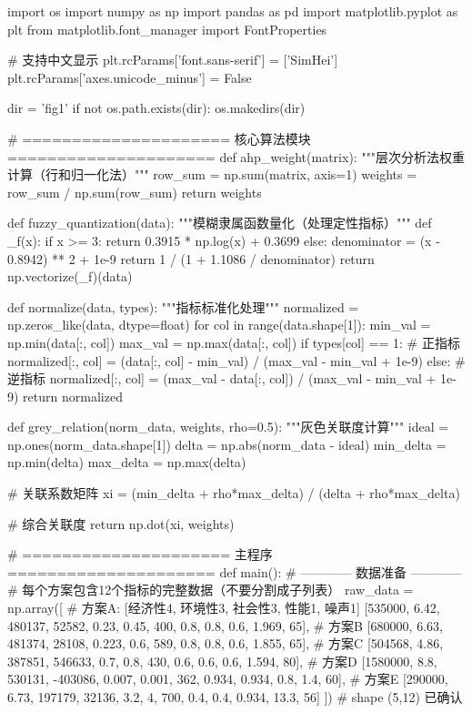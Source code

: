 \documentclass[12pt]{article}
\begin{document}
\begin{python}[language=Python, caption= 全部代码]

import os
import numpy as np
import pandas as pd
import matplotlib.pyplot as plt
from matplotlib.font_manager import FontProperties

# 支持中文显示
plt.rcParams['font.sans-serif'] = ['SimHei']
plt.rcParams['axes.unicode_minus'] = False


dir = 'fig1'
if not os.path.exists(dir):
    os.makedirs(dir)

# ===================== 核心算法模块 =====================
def ahp_weight(matrix):
    """层次分析法权重计算（行和归一化法）"""
    row_sum = np.sum(matrix, axis=1)
    weights = row_sum / np.sum(row_sum)
    return weights

def fuzzy_quantization(data):
    """模糊隶属函数量化（处理定性指标）"""
    def _f(x):
        if x >= 3:
            return 0.3915 * np.log(x) + 0.3699
        else:
            denominator = (x - 0.8942) ** 2 + 1e-9
            return 1 / (1 + 1.1086 / denominator)
    return np.vectorize(_f)(data)

def normalize(data, types):
    """指标标准化处理"""
    normalized = np.zeros_like(data, dtype=float)
    for col in range(data.shape[1]):
        min_val = np.min(data[:, col])
        max_val = np.max(data[:, col])
        if types[col] == 1:  # 正指标
            normalized[:, col] = (data[:, col] - min_val) / (max_val - min_val + 1e-9)
        else:  # 逆指标
            normalized[:, col] = (max_val - data[:, col]) / (max_val - min_val + 1e-9)
    return normalized

def grey_relation(norm_data, weights, rho=0.5):
    """灰色关联度计算"""
    ideal = np.ones(norm_data.shape[1])
    delta = np.abs(norm_data - ideal)
    min_delta = np.min(delta)
    max_delta = np.max(delta)
    
    # 关联系数矩阵
    xi = (min_delta + rho*max_delta) / (delta + rho*max_delta)
    
    # 综合关联度
    return np.dot(xi, weights)

# ===================== 主程序 =====================
def main():
    # ------------ 数据准备 ------------
    # 每个方案包含12个指标的完整数据（不要分割成子列表）
    raw_data = np.array([
        # 方案A: [经济性4, 环境性3, 社会性3, 性能1, 噪声1]
        [535000, 6.42, 480137, 52582, 0.23, 0.45, 400, 0.8, 0.8, 0.6, 1.969, 65],
        # 方案B
        [680000, 6.63, 481374, 28108, 0.223, 0.6, 589, 0.8, 0.8, 0.6, 1.855, 65],
        # 方案C
        [504568, 4.86, 387851, 546633, 0.7, 0.8, 430, 0.6, 0.6, 0.6, 1.594, 80],
        # 方案D 
        [1580000, 8.8, 530131, -403086, 0.007, 0.001, 362, 0.934, 0.934, 0.8, 1.4, 60],
        # 方案E
        [290000, 6.73, 197179, 32136, 3.2, 4, 700, 0.4, 0.4, 0.934, 13.3, 56]
    ])  # shape (5,12) 已确认


\end{python}
\end{document}
